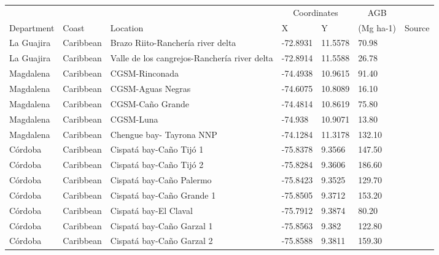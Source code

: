 \documentclass[authoryear]{elsarticle}   	%
\begin{document}
\begin{table}[htbp]
   \centering \tiny
   \begin{tabular}{p{2.0cm}p{2.0cm}p{4.0cm}p{1.0cm}p{1.0cm}p{2.0cm}p{2.5cm}} %
      \toprule 
        &&&\multicolumn{2}{c}{Coordinates}&\multicolumn{1}{c}{AGB}&\\      
      Department&Coast&Location&X&Y&(Mg ha-1)&Source\\
            \midrule 
La Guajira&Caribbean&Brazo Riito-Rancher\'{i}a river delta&-72.8931&11.5578&70.98&\citet{Lema2007}\\ 
La Guajira&Caribbean&Valle de los cangrejos-Rancher\'{i}a river delta&-72.8914&11.5588&26.78&\citet{Lema2007}\\ 
Magdalena&Caribbean&CGSM-Rinconada&-74.4938&10.9615&91.40&\citet{DelaPena2010}\\ 
Magdalena&Caribbean&CGSM-Aguas Negras&-74.6075&10.8089&16.10&\citet{DelaPena2010}\\ 
Magdalena&Caribbean&CGSM-Ca\~{n}o Grande&-74.4814&10.8619&75.80&\citet{DelaPena2010}\\ 
Magdalena&Caribbean&CGSM-Luna&-74.938&10.9071&13.80&\citet{DelaPena2010}\\ 
Magdalena&Caribbean&Chengue bay- Tayrona NNP&-74.1284&11.3178&132.10&\citet{INVEMAR2007}\\ 
C\'{o}rdoba&Caribbean&Cispat\'{a} bay-Ca\~{n}o Tij\'{o} 1&-75.8378&9.3566&147.50&\citet{Bolivar_inpreparation}\\ 
C\'{o}rdoba&Caribbean&Cispat\'{a} bay-Ca\~{n}o Tij\'{o} 2&-75.8284&9.3606&186.60&\citet{Bolivar_inpreparation}\\ 
C\'{o}rdoba&Caribbean&Cispat\'{a} bay-Ca\~{n}o Palermo&-75.8423&9.3525&129.70&\citet{Bolivar_inpreparation}\\ 
C\'{o}rdoba&Caribbean&Cispat\'{a} bay-Ca\~{n}o Grande 1&-75.8505&9.3712&153.20&\citet{Bolivar_inpreparation}\\ 
C\'{o}rdoba&Caribbean&Cispat\'{a} bay-El Claval&-75.7912&9.3874&80.20&\citet{Bolivar_inpreparation}\\ 
C\'{o}rdoba&Caribbean&Cispat\'{a} bay-Ca\~{n}o  Garzal 1&-75.8563&9.382&122.80&\citet{Bolivar_inpreparation}\\ 
C\'{o}rdoba&Caribbean&Cispat\'{a} bay-Ca\~{n}o  Garzal 2&-75.8588&9.3811&159.30&\citet{Bolivar_inpreparation}\\ 

\end{tabular}
\end{table}
\end{document}
